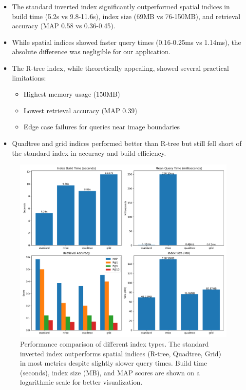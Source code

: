 \documentclass[manuscript,screen]{acmart}
\begin{document}
\begin{itemize}
    \item The standard inverted index significantly outperformed spatial indices in build time (5.2s vs 9.8-11.6s), index size (69MB vs 76-150MB), and retrieval accuracy (MAP 0.58 vs 0.36-0.45).
    \item While spatial indices showed faster query times (0.16-0.25ms vs 1.14ms), the absolute difference was negligible for our application.
    \item The R-tree index, while theoretically appealing, showed several practical limitations:
          \begin{itemize}
              \item Highest memory usage (150MB)
              \item Lowest retrieval accuracy (MAP 0.39)
              \item Edge case failures for queries near image boundaries
          \end{itemize}
    \item Quadtree and grid indices performed better than R-tree but still fell short of the standard index in accuracy and build efficiency.
\end{itemize}

\begin{figure}[t]
    \centering
    \includegraphics[width=\linewidth]{../output/benchmark/benchmark_results.png}
    \caption{Performance comparison of different index types. The standard inverted index outperforms spatial indices (R-tree, Quadtree, Grid) in most metrics despite slightly slower query times. Build time (seconds), index size (MB), and MAP scores are shown on a logarithmic scale for better visualization.}
    \label{fig:index_comparison}
\end{figure}
\end{document}
